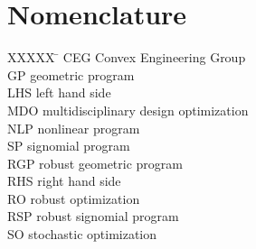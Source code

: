 \section*{Nomenclature}

\begin{tabbing}
  XXXXX \= \kill%
  CEG \> Convex Engineering Group \\
  GP \> geometric program \\
  LHS \> left hand side \\
  MDO \> multidisciplinary design optimization \\
  NLP \> nonlinear program \\
  SP \> signomial program \\
  RGP \> robust geometric program \\
  RHS \> right hand side \\
  RO \> robust optimization \\
  RSP \> robust signomial program \\
  SO \> stochastic optimization \\
 \end{tabbing}
